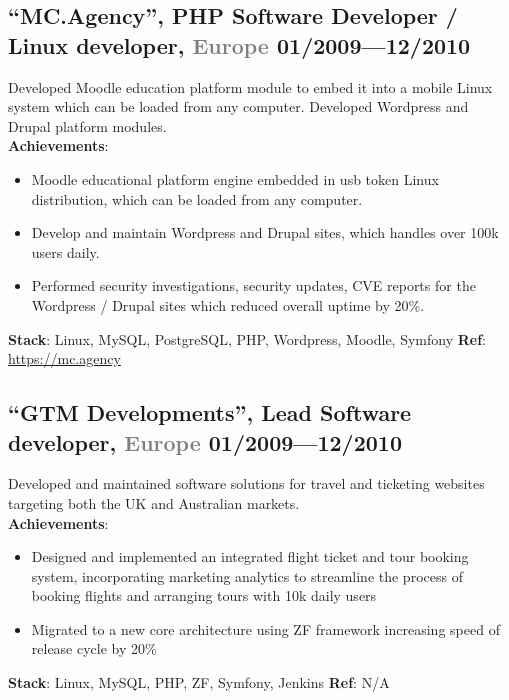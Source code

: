 \documentclass[9pt]{extarticle}
\newcommand{\datedsubsection}[2]{%
  \subsection[#1]{\small\bfseries #1 \hfill\small #2}%
}
\begin{document}
\datedsubsection{``MC.Agency'', \textbf{PHP Software Developer / Linux developer}, \textcolor{gray}{Europe}}{01/2009---12/2010}
Developed Moodle education platform module to embed it into a mobile Linux system which can be loaded from any computer.
Developed Wordpress and Drupal platform modules.\\
\textbf{Achievements}:
\begin{itemize}
  \item{ Moodle educational platform engine embedded in usb token Linux distribution, which can be loaded from any computer. }
  \item{ Develop and maintain Wordpress and Drupal sites, which handles over 100k users daily. }
  \item{ Performed security investigations, security updates, CVE reports for the Wordpress / Drupal  sites which reduced overall uptime by 20\%. }
\end{itemize}
\textbf{Stack}: Linux, MySQL, PostgreSQL, PHP, Wordpress, Moodle, Symfony
\textbf{Ref}: \href{https://mc.agency}{https://mc.agency}

\datedsubsection{``GTM Developments'', \textbf{Lead Software developer}, \textcolor{gray}{Europe}}{01/2009---12/2010}
Developed and maintained software solutions for travel and ticketing websites targeting both the UK and Australian markets.\\
\textbf{Achievements}:
\begin{itemize}
  \item{Designed and implemented an integrated flight ticket and tour booking system, incorporating marketing analytics to streamline the process of booking flights and arranging tours with 10k daily users}
  \item{ Migrated to a new core architecture using ZF framework increasing speed of release cycle by 20\% }
\end{itemize}
\textbf{Stack}: Linux, MySQL, PHP, ZF, Symfony, Jenkins
\textbf{Ref}: N/A
\end{document}
